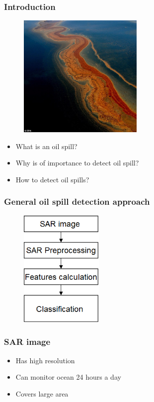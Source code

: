 \documentclass{beamer}
\begin{document}
\begin{frame}
\frametitle{Introduction}
\begin{minipage}[r]{0.33\textwidth}
\begin{figure}
	\centering
    \includegraphics[width=60mm,scale=1]{./img/mex.jpg}
\end{figure}
\end{minipage}

\begin{minipage}[h]{0.33\textwidth}
\begin{itemize}
	\item What is an oil spill?
	\item Why is of importance to detect oil spill? %
	\item How to detect oil spills? %
	
	
\end{itemize}
\end{minipage}

\end{frame}

\begin{frame}
\frametitle{General oil spill detection approach}
\begin{figure}
	\centering
    \includegraphics[width=40mm,scale=1]{./img/basicsteps.png}
\end{figure}



\end{frame}
\begin{frame}
\frametitle{SAR image}
\begin{itemize}
	\item Has high resolution
	\item Can monitor ocean 24 hours a day
	\item Covers large area 

\end{itemize}
\end{frame}
\end{document}
